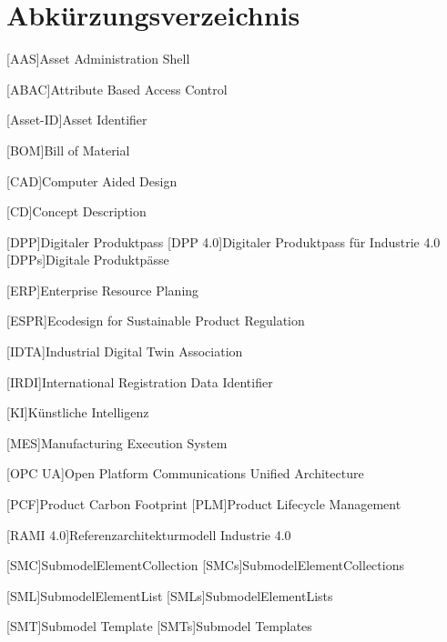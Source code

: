 \section*{Abkürzungsverzeichnis}
\begin{singlespacing}
\end{singlespacing}
\begin{acronym}

[AAS]{Asset Administration Shell}

[ABAC]{Attribute Based Access Control}

[Asset-ID]{Asset Identifier}

[BOM]{Bill of Material}

[CAD]{Computer Aided Design}

[CD]{Concept Description}

[DPP]{Digitaler Produktpass}
[DPP 4.0]{Digitaler Produktpass für Industrie 4.0}
[DPPs]{Digitale Produktpässe}

[ERP]{Enterprise Resource Planing}

[ESPR]{Ecodesign for Sustainable Product Regulation}

[IDTA]{Industrial Digital Twin Association}

[IRDI]{International Registration Data Identifier}

[KI]{Künstliche Intelligenz}

[MES]{Manufacturing Execution System}

[OPC UA]{Open Platform Communications Unified Architecture}

[PCF]{Product Carbon Footprint}
[PLM]{Product Lifecycle Management}

[RAMI 4.0]{Referenzarchitekturmodell Industrie 4.0}

[SMC]{SubmodelElementCollection}
[SMCs]{SubmodelElementCollections}

[SML]{SubmodelElementList}
[SMLs]{SubmodelElementLists}

[SMT]{Submodel Template}
[SMTs]{Submodel Templates}

\end{acronym}



\newpage